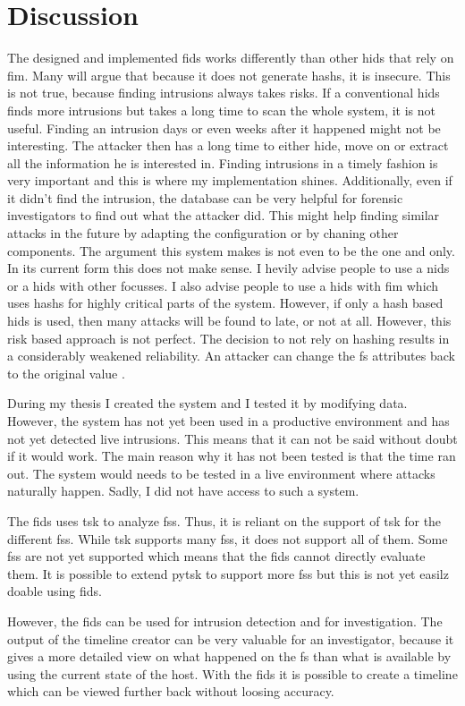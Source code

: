 
\chapter{Discussion}
\label{sec:Discussion}


The designed and implemented \gls{fids} works differently than other \gls{hids} that rely on \gls{fim}. Many will argue that because it does not generate \glspl{hash}, it is insecure. This is not true, because finding intrusions always takes risks. If a conventional \gls{hids} finds more intrusions but takes a long time to scan the whole system, it is not useful. Finding an intrusion days or even weeks after it happened might not be interesting. The attacker then has a long time to either hide, move on or extract all the information he is interested in. Finding intrusions in a timely fashion is very important and this is where my implementation shines. Additionally, even if it didn't find the intrusion, the database can be very helpful for forensic investigators to find out what the attacker did. This might help finding similar attacks in the future by adapting the configuration or by chaning other components. The argument this system makes is not even to be the one and only. In its current form this does not make sense. I hevily advise people to use a \gls{nids} or a \gls{hids} with other focusses. I also advise people to use a \gls{hids} with \gls{fim} which uses \glspl{hash} for highly critical parts of the system. However, if only a hash based \gls{hids} is used, then many attacks will be found to late, or not at all. However, this risk based approach is not perfect. The decision to not rely on hashing results in a considerably weakened reliability. An attacker can change the \gls{fs} attributes back to the original value \cite{changing:attributes}. 

During my thesis I created the system and I tested it by modifying data. However, the system has not yet been used in a productive environment and has not yet detected live intrusions. This means that it can not be said without doubt if it would work. The main reason why it has not been tested is that the time ran out. The system would needs to be tested in a live environment where attacks naturally happen. Sadly, I did not have access to such a system. 

The \gls{fids} uses \gls{tsk} to analyze \glspl{fs}. Thus, it is reliant on the support of \gls{tsk} for the different \glspl{fs}. While \gls{tsk} supports many \glspl{fs}, it does not support all of them. Some \glspl{fs} are not yet supported which means that the \gls{fids} cannot directly evaluate them. It is possible to extend \gls{pytsk} to support more \glspl{fs} but this is not yet easilz doable using \gls{fids}. 

However, the \gls{fids} can be used for intrusion detection and for investigation. The output of the timeline creator can be very valuable for an investigator, because it gives a more detailed view on what happened on the \gls{fs} than what is available by using the current state of the host. With the \gls{fids} it is possible to create a timeline which can be viewed further back without loosing accuracy. 
